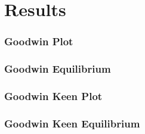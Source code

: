 \documentclass{beamer}
\begin{document}
\section{Results}
\begin{frame}
\frametitle{Goodwin Plot}
\begin{center}
\label{frequencyGraph}

\end{center}
\end{frame}
\begin{frame}
\frametitle{Goodwin Equilibrium}
\begin{center}
\label{frequencyGraph}

\end{center}
\end{frame}
\begin{frame}
\frametitle{Goodwin Keen Plot}
\begin{center}
\label{frequencyGraph}

\end{center}
\end{frame}
\begin{frame}
\frametitle{Goodwin Keen Equilibrium}
\begin{center}
\label{frequencyGraph}

\end{center}
\end{frame}
\end{document}
